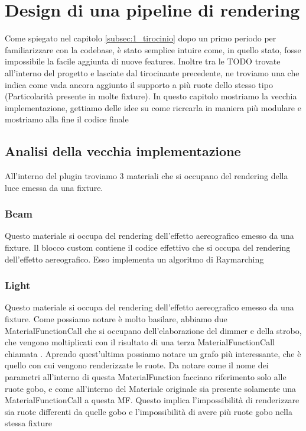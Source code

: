 \documentclass[main.tex]{subfiles}
\begin{document}
\sloppy


\vspace{1.0cm}

\section{Design di una pipeline di rendering}\label{sec:RenderingPipeline}
Come spiegato nel capitolo \ref{subsec:1_tirocinio} dopo un primo periodo per familiarizzare con la codebase, è stato semplice intuire come, in quello stato, fosse impossibile la facile aggiunta di nuove features. Inoltre tra le TODO trovate all'interno del progetto e lasciate dal tirocinante precedente, ne troviamo una che indica come vada ancora aggiunto il supporto a più ruote dello stesso tipo (Particolarità presente in molte fixture). In questo capitolo mostriamo la vecchia implementazione, gettiamo delle idee su come ricrearla in maniera più modulare e mostriamo alla fine il codice finale

\subsection{Analisi della vecchia implementazione}\label{subsec:2_oldImplementation}
All'interno del plugin troviamo 3 materiali che si occupano del rendering della luce emessa da una fixture.
\subsubsection{Beam}\label{subsec:2_1_beam}
Questo materiale si occupa del rendering dell'effetto aereografico emesso da una fixture.
Il blocco custom contiene il codice effettivo che si occupa del rendering dell'effetto aereografico. Esso implementa un algoritmo di Raymarching

\subsubsection{Light}\label{subsec:2_1_light}
Questo materiale si occupa del rendering dell'effetto aereografico emesso da una fixture.
Come possiamo notare è molto basilare, abbiamo due MaterialFunctionCall che si occupano dell'elaborazione del dimmer e della strobo, che vengono moltiplicati con il risultato di una terza MaterialFunctionCall chiamata . Aprendo quest'ultima possiamo notare un grafo più interessante, che è quello con cui vengono renderizzate le ruote.
Da notare come il nome dei parametri all'interno di questa MaterialFunction facciano riferimento solo alle ruote gobo, e come all'interno del Materiale originale sia presente solamente una MaterialFunctionCall a questa MF. Questo implica l'impossibilità di renderizzare sia ruote differenti da quelle gobo e l'impossibilità di avere più ruote gobo nella stessa fixture
\end{document}

